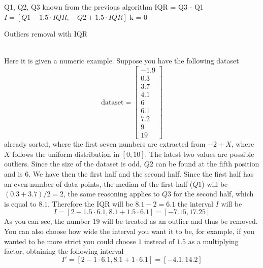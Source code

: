 \documentclass[12pt]{report}
\begin{document}
\begin{algorithm}[H]
\SetAlgoLined
{}
Q1, Q2, Q3 known from the previous algorithm\;
IQR = Q3 - Q1\;
$I=[Q1-1.5\cdot IQR,\quad Q2 + 1.5\cdot IQR]$\;
k = 0\;
 \caption{Outliers removal with IQR}
\end{algorithm}
\noindent \\Here it is given a numeric example. Suppose you have the following dataset 
$$
\text{dataset}=\begin{bmatrix}
-1.9\\ 
0.3\\ 
3.7\\
4.1\\
6\\
6.1\\
7.2\\
9\\
19
\end{bmatrix}
$$
already sorted, where the first seven numbers are extracted from $-2+X$, where $X$ follows the uniform distribution in $[0,10]$. The latest two values are possible outliers. Since the size of the dataset is odd, $Q2$ can be found at the fifth position and is $6$. We have then the first half and the second half. Since the first half has an even number of data points, the median of the first half ($Q1$) will be $(0.3+3.7)/2=2$, the same reasoning applies to $Q3$ for the second half, which is equal to $8.1$. Therefore the IQR will be $8.1-2=6.1$ the interval $I$ will be
$$I=[2-1.5\cdot6.1,8.1+1.5\cdot6.1]=[-7.15,17.25]$$
As you can see, the number $19$ will be treated as an outlier and thus be removed. You can also choose how wide the interval you want it to be, for example, if you wanted to be more strict you could choose $1$ instead of $1.5$ as a multiplying factor, obtaining the following interval
$$I'=[2-1\cdot6.1,8.1+1\cdot6.1]=[-4.1,14.2]$$
\end{document}
